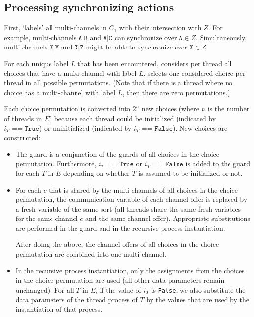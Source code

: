 \subsection{Processing synchronizing actions}

First, \lpeq{} `labels' all multi-channels in $C_1$ with their intersection with $Z$.
For example, multi-channels $\texttt{A|B}$ and $\texttt{A|C}$ can synchronize over $\texttt{A} \in Z$.
Simultaneously, multi-channels $\texttt{X|Y}$ and $\texttt{X|Z}$ might be able to synchronize over $\texttt{X} \in Z$.

For each unique label $L$ that has been encountered, \lpeq{} considers per thread all choices that have a multi-channel with label $L$.
\lpeq{} selects one considered choice per thread in all possible permutations.
(Note that if there is a thread where no choice has a multi-channel with label $L$, then there are zero permutations.)

Each choice permutation is converted into $2^n$ new choices (where $n$ is the number of threads in $E$) because each thread could be initialized (indicated by $i_T \texttt{ == True}$) or uninitialized (indicated by $i_T \texttt{ == False}$).
New choices are constructed:
\begin{itemize}
\item The guard is a conjunction of the guards of all choices in the choice permutation.
Furthermore, $i_T \texttt{ == True}$ or $i_T \texttt{ == False}$ is added to the guard for each $T$ in $E$ depending on whether $T$ is assumed to be initialized or not.
\item For each $c$ that is shared by the multi-channels of all choices in the choice permutation, the communication variable of each channel offer is replaced by a fresh variable of the same sort (all threads share the same fresh variables for the same channel $c$ and the same channel offer).
Appropriate substitutions are performed in the guard and in the recursive process instantiation.

After doing the above, the channel offers of all choices in the choice permutation are combined into one multi-channel.
\item In the recursive process instantiation, only the assignments from the choices in the choice permutation are used (all other data parameters remain unchanged).
For all $T$ in $E$, if the value of $i_T$ is \texttt{False}, we also substitute the data parameters of the thread process of $T$ by the values that are used by the instantiation of that process.
\end{itemize}

